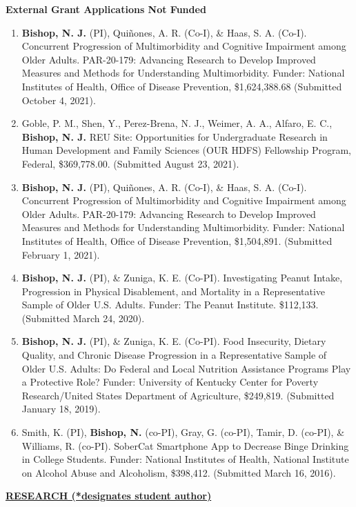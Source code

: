 \documentclass[
]{article}
\begin{document}
\textbf{External Grant Applications Not Funded}

\begin{enumerate}
\def\labelenumi{\arabic{enumi}.}
\item
  \textbf{Bishop, N. J.} (PI), Quiñones, A. R. (Co-I), \& Haas, S. A.
  (Co-I). Concurrent Progression of Multimorbidity and Cognitive
  Impairment among Older Adults. PAR-20-179: Advancing Research to
  Develop Improved Measures and Methods for Understanding
  Multimorbidity. Funder: National Institutes of Health, Office of
  Disease Prevention, \$1,624,388.68 (Submitted October 4, 2021).
\item
  Goble, P. M., Shen, Y., Perez-Brena, N. J., Weimer, A. A., Alfaro, E.
  C., \textbf{Bishop, N. J.} REU Site: Opportunities for Undergraduate
  Research in Human Development and Family Sciences (OUR HDFS)
  Fellowship Program, Federal, \$369,778.00. (Submitted August 23,
  2021).
\item
  \textbf{Bishop, N. J.} (PI), Quiñones, A. R. (Co-I), \& Haas, S. A.
  (Co-I). Concurrent Progression of Multimorbidity and Cognitive
  Impairment among Older Adults. PAR-20-179: Advancing Research to
  Develop Improved Measures and Methods for Understanding
  Multimorbidity. Funder: National Institutes of Health, Office of
  Disease Prevention, \$1,504,891. (Submitted February 1, 2021).
\item
  \textbf{Bishop, N. J.} (PI), \& Zuniga, K. E. (Co-PI). Investigating
  Peanut Intake, Progression in Physical Disablement, and Mortality in a
  Representative Sample of Older U.S. Adults. Funder: The Peanut
  Institute. \$112,133. (Submitted March 24, 2020).
\item
  \textbf{Bishop, N. J.} (PI), \& Zuniga, K. E. (Co-PI). Food
  Insecurity, Dietary Quality, and Chronic Disease Progression in a
  Representative Sample of Older U.S. Adults: Do Federal and Local
  Nutrition Assistance Programs Play a Protective Role? Funder:
  University of Kentucky Center for Poverty Research/United States
  Department of Agriculture, \$249,819. (Submitted January 18, 2019).
\item
  Smith, K. (PI), \textbf{Bishop, N.} (co-PI), Gray, G. (co-PI), Tamir,
  D. (co-PI), \& Williams, R. (co-PI). SoberCat Smartphone App to
  Decrease Binge Drinking in College Students. Funder: National
  Institutes of Health, National Institute on Alcohol Abuse and
  Alcoholism, \$398,412. (Submitted March 16, 2016).
\end{enumerate}

\uline{\textbf{RESEARCH (*designates student author)}}
\end{document}

